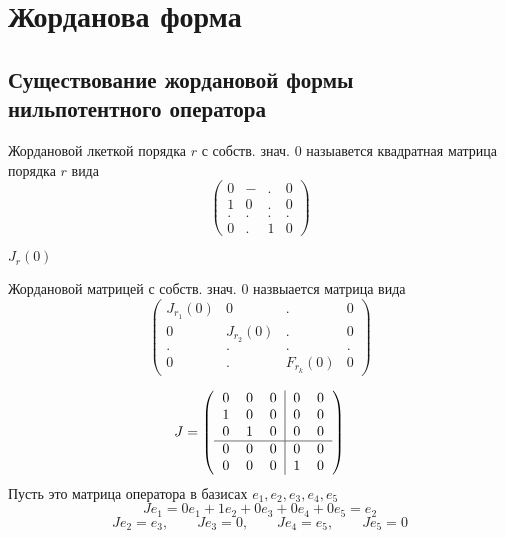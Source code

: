\section{Жорданова форма}

\subsection{Существование жордановой формы нильпотентного оператора}

\begin{definition}
	Жордановой лкеткой порядка $ r $ с собств. знач. $ 0 $ назыавется квадратная матрица порядка $ r $ вида
	$$
	\begin{pmatrix}
		0 & - & . & 0 \\
		1 & 0 & . & 0 \\
		. & . & . & . \\
		0 & . & 1 & 0
	\end{pmatrix} $$
\end{definition}

\begin{notation}
	$ J_r(0) $
\end{notation}

\begin{definition}
	Жордановой матрицей с собств. знач. $ 0 $ назвыается матрица вида
	$$
	\begin{pmatrix}
		J_{r_1}(0) & 0 & . & 0 \\
		0 & J_{r_2}(0) & . & 0 \\
		. & . & . & . \\
		0 & . & F_{r_k}(0) & 0
	\end{pmatrix} $$
\end{definition}

\begin{eg}
	$$ J = \left(
	\begin{tabular}{c c c | c c}
		0 & 0 & 0 & 0 & 0 \\
		1 & 0 & 0 & 0 & 0 \\
		0 & 1 & 0 & 0 & 0 \\
		\hline
		0 & 0 & 0 & 0 & 0 \\
		0 & 0 & 0 & 1 & 0 \\
	\end{tabular} \right) $$
	Пусть это матрица оператора в базисах $ e_1, e_2, e_3, e_4, e_5 $
	$$ Je_1 = 0e_1 + 1e_2 + 0e_3 + 0e_4 + 0e_5 = e_2 $$
	$$ Je_2 = e_3, \qquad Je_3 = 0, \qquad Je_4 = e_5, \qquad Je_5 = 0 $$
\end{eg}

